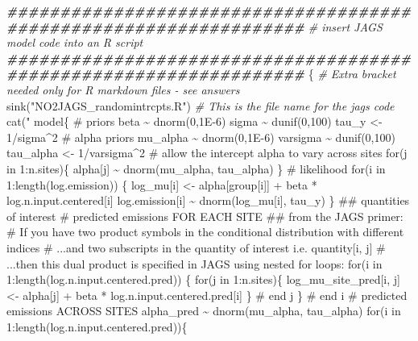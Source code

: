 \documentclass[
]{article}
\newenvironment{Shaded}{\begin{snugshade}}{\end{snugshade}}
\newcommand{\CommentTok}[1]{\textcolor[rgb]{0.56,0.35,0.01}{\textit{#1}}}
\newcommand{\DocumentationTok}[1]{\textcolor[rgb]{0.56,0.35,0.01}{\textbf{\textit{#1}}}}
\newcommand{\FunctionTok}[1]{\textcolor[rgb]{0.00,0.00,0.00}{#1}}
\newcommand{\NormalTok}[1]{#1}
\newcommand{\StringTok}[1]{\textcolor[rgb]{0.31,0.60,0.02}{#1}}
\begin{document}
\begin{Shaded}
\begin{Highlighting}[]
\DocumentationTok{\#\#\#\#\#\#\#\#\#\#\#\#\#\#\#\#\#\#\#\#\#\#\#\#\#\#\#\#\#\#\#\#\#\#\#\#\#\#\#\#\#\#\#\#\#\#\#\#\#\#\#\#\#\#\#\#\#\#\#\#\#\#\#\#\#\#}
\CommentTok{\# insert JAGS model code into an R script}
\DocumentationTok{\#\#\#\#\#\#\#\#\#\#\#\#\#\#\#\#\#\#\#\#\#\#\#\#\#\#\#\#\#\#\#\#\#\#\#\#\#\#\#\#\#\#\#\#\#\#\#\#\#\#\#\#\#\#\#\#\#\#\#\#\#\#\#\#\#\#}
\NormalTok{\{ }\CommentTok{\# Extra bracket needed only for R markdown files {-} see answers}
  \FunctionTok{sink}\NormalTok{(}\StringTok{"NO2JAGS\_randomintrcpts.R"}\NormalTok{) }\CommentTok{\# This is the file name for the jags code}
  \FunctionTok{cat}\NormalTok{(}\StringTok{"}
\StringTok{  model\{}
\StringTok{    \# priors}
\StringTok{    beta \textasciitilde{} dnorm(0,1E{-}6)}
\StringTok{    sigma \textasciitilde{} dunif(0,100)}
\StringTok{    tau\_y \textless{}{-} 1/sigma\^{}2}
\StringTok{    \# alpha priors}
\StringTok{    mu\_alpha \textasciitilde{} dnorm(0,1E{-}6)}
\StringTok{    varsigma \textasciitilde{} dunif(0,100)}
\StringTok{    tau\_alpha \textless{}{-} 1/varsigma\^{}2}
\StringTok{    \# allow the intercept alpha to vary across sites}
\StringTok{      for(j in 1:n.sites)\{}
\StringTok{        alpha[j] \textasciitilde{} dnorm(mu\_alpha, tau\_alpha)}
\StringTok{      \}}
\StringTok{  }
\StringTok{    \# likelihood}
\StringTok{    for(i in 1:length(log.emission)) \{}
\StringTok{      log\_mu[i] \textless{}{-} alpha[group[i]] + beta * log.n.input.centered[i]}
\StringTok{      log.emission[i] \textasciitilde{} dnorm(log\_mu[i], tau\_y)}
\StringTok{    \}}
\StringTok{  }
\StringTok{    \#\# quantities of interest}
\StringTok{      \# predicted emissions FOR EACH SITE}
\StringTok{        \#\# from the JAGS primer: }
\StringTok{          \# If you have two product symbols in the conditional distribution with different indices}
\StringTok{            \# ...and two subscripts in the quantity of interest i.e. quantity[i, j] }
\StringTok{            \# ...then this dual product is specified in JAGS using nested for loops:}
\StringTok{        for(i in 1:length(log.n.input.centered.pred)) \{}
\StringTok{          for(j in 1:n.sites)\{}
\StringTok{            log\_mu\_site\_pred[i, j] \textless{}{-} alpha[j] + beta * log.n.input.centered.pred[i]}
\StringTok{          \} \# end j}
\StringTok{        \} \# end i}
\StringTok{      }
\StringTok{      \# predicted emissions ACROSS SITES}
\StringTok{        alpha\_pred \textasciitilde{} dnorm(mu\_alpha, tau\_alpha)}
\StringTok{        for(i in 1:length(log.n.input.centered.pred))\{}

\end{Highlighting}
\end{Shaded}
\end{document}
